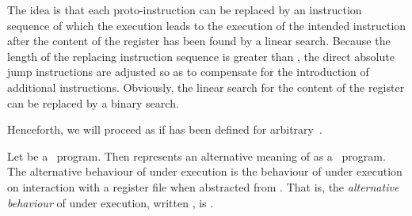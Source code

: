 \documentclass[fleqn]{llncs}
\begin{document}
The idea is that each proto-instruction can be replaced by an
instruction sequence of which the execution leads to the execution of
the intended instruction after the content of the register has been
found by a linear search.
Because the length of the replacing instruction sequence is greater than
, the direct absolute jump instructions are adjusted so as to
compensate for the introduction of additional instructions.
Obviously, the linear search for the content of the register can be
replaced by a binary search.

Henceforth, we will proceed as if  has been defined for
arbitrary~.

Let  be a \PGLDdii\ program.
Then  represents an alternative meaning of  as a
\PGLD\ program.
The alternative behaviour of  under execution is the behaviour of
 under execution on interaction with a register file
when abstracted from .
That is, the \emph{alternative behaviour} of  under execution,
written , is
.
\end{document}
